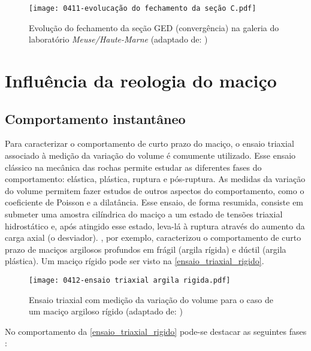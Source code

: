 \begin{figure}[H]
	\begin{center}
		\texttt{[image: 0411-evolucação do fechamento da seção C.pdf]}
	\end{center}
	\caption{\label{evolucao_GED}Evolução do fechamento da seção GED (convergência) na galeria do laboratório \textit{Meuse/Haute-Marne}  (adaptado de: )}
\end{figure}



\section{Influência da reologia do maciço}

\subsection{Comportamento instantâneo}\label{comportamento_instantaneo}

Para caracterizar o comportamento de curto prazo do maciço, o ensaio triaxial associado à medição da variação do volume é comumente utilizado. Esse ensaio clássico na mecânica das rochas permite estudar as diferentes fases do comportamento: elástica, plástica, ruptura e pós-ruptura. As medidas da variação do volume permitem fazer estudos de outros aspectos do comportamento, como o coeficiente de Poisson e a dilatância. Esse ensaio, de forma resumida, consiste em submeter uma amostra cilíndrica do maciço a um estado de tensões triaxial hidrostático e, após atingido esse estado, leva-lá à ruptura através do aumento da carga axial (o desviador). , por exemplo, caracterizou o comportamento de curto prazo de maciços argilosos profundos em frágil (argila rígida) e dúctil (argila plástica). Um maciço rígido pode ser visto na \autoref{ensaio_triaxial_rigido}.

\begin{figure}[H]
	\begin{center}
		\texttt{[image: 0412-ensaio triaxial argila rigida.pdf]}
	\end{center}
	\caption{\label{ensaio_triaxial_rigido}Ensaio triaxial com medição da variação do volume para o caso de um maciço argiloso rígido (adaptado de: )}
\end{figure}

No comportamento da \autoref{ensaio_triaxial_rigido} pode-se destacar as seguintes fases \cite[p. 34]{Rousset1988}:

